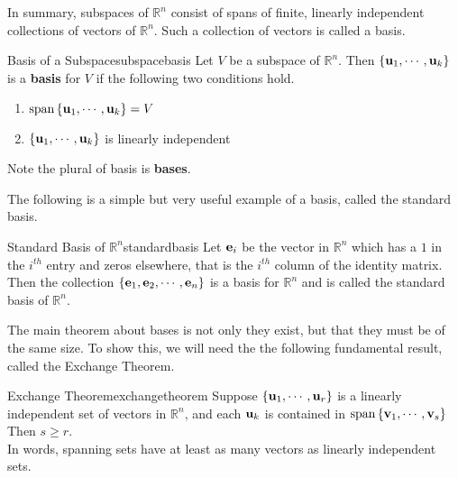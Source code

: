 In summary, subspaces of $\mathbb{R}^{n}$ consist of spans of finite,
linearly independent collections of vectors of $\mathbb{R}^{n}$.  Such
a collection of vectors is called a basis. 

\begin{definition}{Basis of a Subspace}{subspacebasis}
Let $V$ be a subspace of $\mathbb{R}^{n}$. Then $\left\{
{\bf u}_{1},\cdots ,{\bf u}_{k}\right\} $ is a \textbf{basis} for $V$ if the following two conditions hold.

\begin{enumerate}
\item $\mbox{span}\left\{ {\bf u}_{1},\cdots ,{\bf u}_{k}\right\} =V$
\item $\left\{ {\bf u}_{1},\cdots ,{\bf u}_{k}\right\} $ is linearly
independent
\end{enumerate}

Note the plural of basis is \textbf{bases}.
\end{definition}

The following is a simple but very useful example of a basis, called the standard basis.

\begin{definition}{Standard Basis of $\mathbb{R}^n$}{standardbasis}
Let ${\bf e}_i$ be the vector in $\mathbb{R}^n$ which has a $1$ in the $i^{th}$ entry and zeros elsewhere, that is the $i^{th}$ column of the identity matrix. Then the collection $\left\{{\bf e}_1, {\bf e}_2, \cdots, {\bf e}_n
\right\}$ is a basis for
$\mathbb{R}^n$ and is called the standard basis of $\mathbb{R}^n$.
\end{definition}

The main theorem about bases is not only they exist, but that they
must be of the same size. To show this, we will need the the following
fundamental result, called the Exchange Theorem.

\begin{theorem}{Exchange Theorem}{exchangetheorem}
Suppose $\left\{ {\bf u}_{1},\cdots ,{\bf u}_{r}\right\} $ is a
linearly independent set of vectors in $\mathbb{R}^n$, and each
${\bf u}_{k}$ is contained in $\mbox{span}\left\{ {\bf v}_{1},\cdots
,{\bf v}_{s}\right\}$ Then $s\geq r.$ \\
In words, spanning  sets have at least as many vectors as linearly
independent sets.
\end{theorem}

